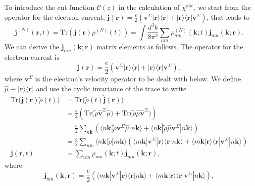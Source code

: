 To introduce the cut function ${\boldsymbol{\mathcal{C}}}(z)$ in the calculation
of $\chi^{\mathrm{abc}}$, we start from the operator for the electron current,
$\mathbf{j}(\mathbf{r})=\frac{e}{2}\left(\mathbf{v}^\Sigma |
\mathbf{r}\rangle\langle\mathbf{r} | + | \mathbf{r}\rangle\langle\mathbf{r} |
\mathbf{v}^\Sigma\right)$, that leads to
\begin{equation}
\mathbf{j}^{(N)}(\mathbf{r},t)=\mathrm{Tr}(\mathbf{j}(\mathbf{r})\rho^{(N)}(t))
=
\int \frac{d^3 k}{8\pi^3}
\sum_{nm}
\rho^{(N)}_{nm}(\mathbf{k};t)\mathbf{j}_{mn}(\mathbf{k};\mathbf{r}).
\label{jmic}
\end{equation}
We can derive the $\mathbf{j}_{mn}(\mathbf{k};\mathbf{r})$ matrix elements as
follows. The operator for the electron current is
\begin{equation}\label{hatjmic}
\mathbf{j}(\mathbf{r})
= \frac{e}{2}\left(\mathbf{v}^{\Sigma} |\mathbf{r}\rangle\langle\mathbf{r}|
+ |\mathbf{r}\rangle\langle\mathbf{r}|\mathbf{v}^{\Sigma}\right), 
\end{equation}
where $\mathbf{v}^{\Sigma}$ is the electron's velocity operator to be dealt with
below. We define $\hat{\mu} \equiv |\mathbf{r}\rangle\langle\mathbf{r}|$ and use
the cyclic invariance of the trace to write
\begin{align}\label{jmic2}
\mathrm{Tr}\Big(\mathbf{j}(\mathbf{r})\tilde{\rho}(t)\Big)
&= \mathrm{Tr}\Big(\tilde{\rho}(t)\hat{\mathbf{j}}(\mathbf{r})\Big)\nonumber\\
&= \frac{e}{2}
\left(
  \mathrm{Tr}\Big(\tilde{\rho}\hat{\mathbf{v}}^{\Sigma}\hat{\mu}\Big)
+ \mathrm{Tr}\Big(\tilde{\rho}\hat{\mu}\hat{\mathbf{v}}^{\Sigma}\Big)
\right)\nonumber\\
&= \frac{e}{2}\sum_{n\mathbf{k}}
\left(
\langle n\mathbf{k}|\tilde{\rho}\mathbf{v}^{\Sigma}\hat{\mu}|n\mathbf{k}\rangle
+ \langle n\mathbf{k}|\tilde{\rho}\hat{\mu}\mathbf{v}^{\Sigma}|n\mathbf{k}\rangle
\right)\nonumber\\
&= \frac{e}{2}\sum_{nm}\langle n\mathbf{k}|\tilde{\rho} |m\mathbf{k}\rangle
\left(
  \langle m\mathbf{k}|
  \mathbf{v}^{\Sigma}|\mathbf{r}\rangle
  \langle\mathbf{r}|n\mathbf{k}\rangle
+ \langle m\mathbf{k}|\mathbf{r}\rangle
  \langle\mathbf{r}| \mathbf{v}^{\Sigma} |n\mathbf{k}\rangle
\right)\nonumber\\
\mathbf{j}(\mathbf{r},t)
&= \sum_{nm}\rho_{nm}(\mathbf{k};t)\mathbf{j}_{mn}(\mathbf{k};\mathbf{r}),
\end{align}
where
\begin{equation}\label{jmic3}
\mathbf{j}_{mn}(\mathbf{k};\mathbf{r})=
\frac{e}{2}
\left(
  \langle m\mathbf{k}|\mathbf{v}^{\Sigma} |\mathbf{r}\rangle 
  \langle\mathbf{r}|n\mathbf{k}\rangle
+ \langle m\mathbf{k}|\mathbf{r}\rangle 
  \langle\mathbf{r}|\mathbf{v}^{\Sigma} |n\mathbf{k}\rangle
\right),
\end{equation}
